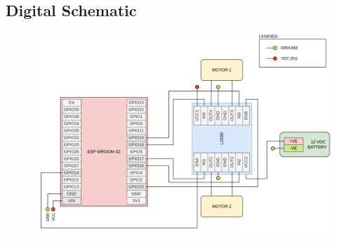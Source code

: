 \documentclass[journal,10pt]{article}
\begin{document}
\subsection{Digital Schematic}
\begin{figure}[htbp]
        \begin{center}
        \includegraphics[scale = 0.5]{3.png}    
        \end{center}
\end{figure}   
\end{document}
